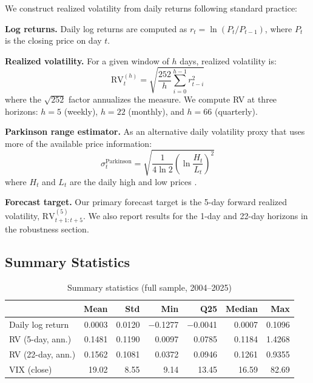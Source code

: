 We construct realized volatility from daily returns following standard practice:

\textbf{Log returns.} Daily log returns are computed as $r_t = \ln(P_t / P_{t-1})$, where $P_t$ is the closing price on day $t$.

\textbf{Realized volatility.} For a given window of $h$ days, realized volatility is:
\begin{equation}
    \text{RV}_{t}^{(h)} = \sqrt{\frac{252}{h} \sum_{i=0}^{h-1} r_{t-i}^2}
\end{equation}
where the $\sqrt{252}$ factor annualizes the measure. We compute RV at three horizons: $h = 5$ (weekly), $h = 22$ (monthly), and $h = 66$ (quarterly).

\textbf{Parkinson range estimator.} As an alternative daily volatility proxy that uses more of the available price information:
\begin{equation}
    \sigma_t^{\text{Parkinson}} = \sqrt{\frac{1}{4 \ln 2} \left(\ln \frac{H_t}{L_t}\right)^2}
\end{equation}
where $H_t$ and $L_t$ are the daily high and low prices \citep{Parkinson1980}.

\textbf{Forecast target.} Our primary forecast target is the 5-day forward realized volatility, $\text{RV}_{t+1:t+5}^{(5)}$. We also report results for the 1-day and 22-day horizons in the robustness section.

\subsection{Summary Statistics}

\begin{table}[H]
\centering
\caption{Summary statistics (full sample, 2004--2025)}
\label{tab:summary}
\begin{tabular}{l r r r r r r}
\toprule
& \textbf{Mean} & \textbf{Std} & \textbf{Min} & \textbf{Q25} & \textbf{Median} & \textbf{Max} \\
\midrule
Daily log return    & 0.0003 & 0.0120 & $-$0.1277 & $-$0.0041 & 0.0007 & 0.1096 \\
RV (5-day, ann.)    & 0.1481 & 0.1190 &    0.0097 &    0.0785 & 0.1184 & 1.4268 \\
RV (22-day, ann.)   & 0.1562 & 0.1081 &    0.0372 &    0.0946 & 0.1261 & 0.9355 \\
VIX (close)         & 19.02  & 8.55   &    9.14   &   13.45   & 16.59  & 82.69  \\
\bottomrule
\end{tabular}
\end{table}

